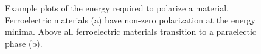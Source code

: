\begin{figure}[tb]
   \centering
   \hspace{0.5cm}	
   \caption[Polarization vs. Applied Field Plots for FE and PE Materials]%
   		{Example plots of the energy required to polarize a material. Ferroelectric materials (a) have %
		non-zero polarization at the energy minima. Above \Tc{} all ferroelectric materials transition %
		to a paraelectic phase (b).}
   \label{fig:PvElec}
\end{figure}































